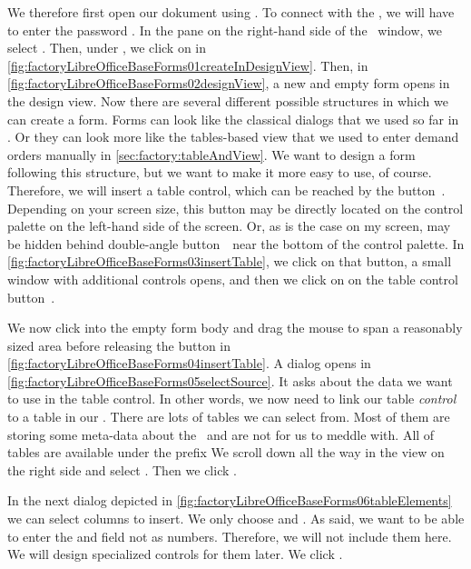 We therefore first open our dokument  using \libreofficeBase.
To connect with the \db, we will have to enter the password .
In the  pane on the right-hand side of the \libreofficeBase\ window, we select .
Then, under , we  click on  in \cref{fig:factoryLibreOfficeBaseForms01createInDesignView}.
Then, in \cref{fig:factoryLibreOfficeBaseForms02designView}, a new and empty form opens in the design view.
Now there are several different possible structures in which we can create a form.
Forms can look like the classical dialogs that we used so far in \libreoffice.
Or they can look more like the tables-based view that we used to enter demand orders manually in \cref{sec:factory:tableAndView}.
We want to design a form following this structure, but we want to make it more easy to use, of course.
Therefore, we will insert a table control, which can be reached by the button~\libreOfficeBaseTable.
Depending on your screen size, this button may be directly located on the control palette on the left-hand side of the screen.
Or, as is the case on my screen, may be hidden behind double-angle button~\libreOfficeBaseMore\ near the bottom of the control palette.
In \cref{fig:factoryLibreOfficeBaseForms03insertTable}, we click on that button, a small window with additional controls opens, and then we click on on the table control button~\libreOfficeBaseTable.

We now click into the empty form body and drag the mouse to span a reasonably sized area before releasing the button in \cref{fig:factoryLibreOfficeBaseForms04insertTable}.
A dialog opens in \cref{fig:factoryLibreOfficeBaseForms05selectSource}.
It asks about the data we want to use in the table control.
In other words, we now need to link our table \emph{control} to a table in our \emph{\db}.
There are lots of tables we can select from.
Most of them are storing some meta-data about the \db\ and are not for us to meddle with.
All of  tables are available under the prefix 
We scroll down all the way in the view on the right side and select .
Then we click .

In the next dialog depicted in \cref{fig:factoryLibreOfficeBaseForms06tableElements} we can select columns to insert.
We only choose  and .
As said, we want to be able to enter the  and  field not as numbers.
Therefore, we will not include them here.
We will design specialized controls for them later.
We click .


